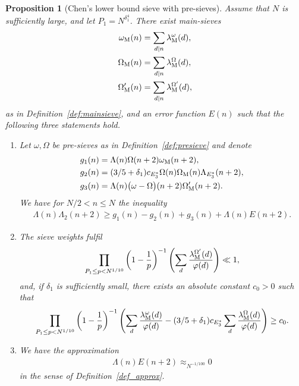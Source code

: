 \documentclass[12pt]{amsart}
\newtheorem{proposition}[theorem]{Proposition}
\theoremstyle{definition}
\theoremstyle{remark}
\numberwithin{equation}{section}
\newcommand{\1}{\mathbf{1}}
\begin{document}
\begin{proposition}[Chen's lower bound sieve with pre-sieves]\label{le_chensieve}
Assume that $N$ is sufficiently large, and let $P_1=N^{\delta_1^4}$. There exist main-sieves 
\begin{align*}
    \omega_{\textnormal{M}}(n)&=\sum_{d\mid n}\lambda^\omega_{\textup{M}}(d),\\
    \Omega_{\textnormal{M}}(n)&=\sum_{d\mid n}\lambda^\Omega_{\textup{M}}(d),\\
    \Omega'_{\textnormal{M}}(n)&=\sum_{d\mid n}\lambda^{\Omega'}_{\textup{M}}(d),
\end{align*}
as in Definition~\ref{def:mainsieve}, and an error function $E(n)$ such that the following three statements hold. 
\begin{enumerate}[label=(\roman*)]
\item Let $\omega,\Omega$ be pre-sieves as in Definition~\ref{def:presieve} and denote
\begin{align*}
    g_1(n)&=\Lambda(n)\Omega(n+2)\omega_{\textnormal{M}}(n+2), \\
    g_2(n)&=(3/5+\delta_1)c_{E_3^*}\Omega(n)\Omega_{\textnormal{M}}(n)\Lambda_{E_3^*}(n+2), \\
    g_3(n)&=\Lambda(n)\bigl(\omega -\Omega\bigr)(n+2)\Omega'_{\textnormal{M}}(n+2).
\end{align*}
We have for $N/2< n\leq N$ the inequality
\begin{align}\label{eq:chenlower_minorisation}
    \Lambda(n)\Lambda_2(n+2)\geq g_1(n)-g_2(n)+g_3(n)+\Lambda(n)E(n+2).
\end{align}
    \item The sieve weights fulfil
    \begin{align}\label{eq:chentrivial_numerics}
     \prod_{P_1\leq p < N^{1/10}}\left(1-\frac{1}{p}\right)^{-1} \left(\sum_{d}\frac{\lambda^{\Omega'}_{\textup{M}}(d)}{\varphi(d)}\right)\ll 1,
    \end{align}
    and, if $\delta_1$ is sufficiently small, there exists an absolute constant $c_0>0$ such that
\begin{align}\label{eq:chenlower_numerics}
   \prod_{P_1\leq p < N^{1/10}}\left(1-\frac{1}{p}\right)^{-1} \left(\sum_{d}\frac{\lambda^\omega_{\textup{M}}(d)}{\varphi(d)}-(3/5+\delta_1) c_{E_3^*}\sum_{d}\frac{\lambda^\Omega_{\textup{M}}(d)}{\varphi(d)}\right)\geq c_0.
\end{align}

\item We have the approximation
\begin{align} \label{eq:chenlower_error}
    \Lambda(n)E(n+2)\approx_{N^{-1/100}} 0
\end{align}
in the sense of Definition~\ref{def_approx}.

\end{enumerate}

\end{proposition}
\end{document}
